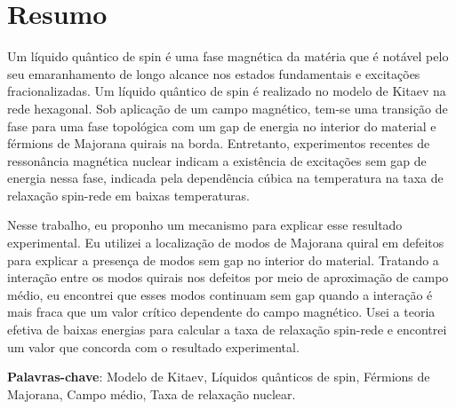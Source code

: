 \documentclass[12pt]{report}
\numberwithin{equation}{section}
\renewcommand{\baselinestretch}{1.2} %
\begin{document}

\chapter*{Resumo}

Um líquido quântico de spin é uma fase magnética da matéria que é  notável  pelo seu emaranhamento de longo alcance nos estados fundamentais  e excitações fracionalizadas.  Um líquido quântico de spin é realizado no modelo de Kitaev na rede hexagonal.  Sob aplicação de um campo magnético, tem-se uma transição de fase para uma fase topológica com um gap de energia no interior do material e férmions de Majorana quirais na borda. Entretanto, experimentos recentes de ressonância magnética nuclear indicam a existência de  excitações sem gap de energia nessa fase, indicada pela dependência cúbica na temperatura na taxa de relaxação spin-rede em baixas temperaturas.

Nesse trabalho, eu proponho um mecanismo para explicar esse resultado experimental. Eu utilizei a localização de modos de Majorana quiral em defeitos para explicar a presença de modos sem gap no interior do material. Tratando a interação entre os modos quirais nos defeitos por meio de aproximação de campo médio, eu encontrei que esses modos continuam sem gap quando a interação é mais fraca que um valor crítico dependente do campo magnético. Usei a teoria efetiva de baixas energias para calcular a taxa de relaxação spin-rede e encontrei um valor que concorda com o resultado experimental.

\textbf{Palavras-chave}:
    Modelo de Kitaev,
    Líquidos quânticos de spin,
    Férmions de Majorana,
    Campo médio,    
    Taxa de relaxação nuclear.



\renewcommand{\baselinestretch}{.01} 
\setlength{\parindent}{.01em}
\tableofcontents
\listoffigures 
\end{document}
